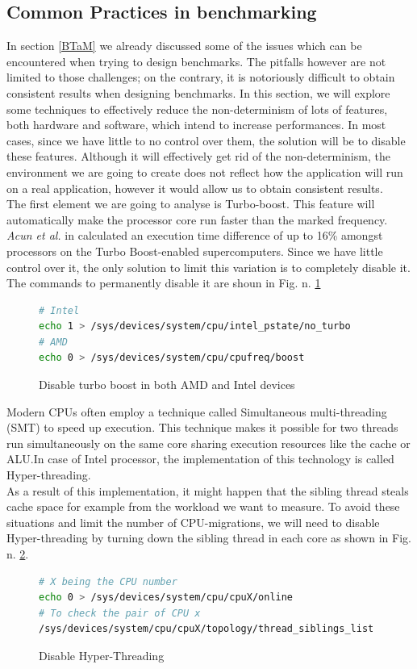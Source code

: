 \subsection{Common Practices in benchmarking}\label{sec:ben_challenges} \label{sec:remove_inter}
In section \ref{BTaM} we already discussed some of the issues which can be encountered when trying to design benchmarks. The pitfalls however are not limited to those challenges; on the contrary, it is notoriously difficult to obtain consistent results when designing benchmarks. In this section, we will explore some techniques to effectively reduce the non-determinism of lots of features, both hardware and software, which intend to increase performances. In most cases, since we have little to no control over them, the solution will be to disable these features. Although it will effectively get rid of the non-determinism, the environment we are going to create does not reflect how the application will run on a real application, however it would allow us to obtain consistent results. \\
The first element we are going to analyse is Turbo-boost. This feature will automatically make the processor core run faster than the marked frequency. \textit{Acun et al.} in \cite{turbo_boost} calculated an execution time difference of up to 16\% amongst processors on the Turbo Boost-enabled supercomputers. Since we have little control over it, the only solution to limit this variation is to completely disable it. The commands to permanently disable it are shoun in Fig. n. \ref{fig:no_boos}
\begin{figure}[h]
\begin{lstlisting}[language=bash]
# Intel
echo 1 > /sys/devices/system/cpu/intel_pstate/no_turbo
# AMD
echo 0 > /sys/devices/system/cpu/cpufreq/boost
\end{lstlisting}
\caption{Disable turbo boost in both AMD and Intel devices}
\label{fig:no_boos}
\end{figure}

Modern CPUs often employ a technique called Simultaneous multi-threading (SMT) to speed up execution. This technique makes it possible for two threads run simultaneously on the same core sharing execution resources like the cache or ALU.In case of Intel processor, the implementation of this technology is called Hyper-threading.\\
As a result of this implementation, it might happen that the sibling thread steals cache space for example from the workload we want to measure. To avoid these situations and limit the number of CPU-migrations, we will need to disable Hyper-threading by turning down the sibling thread in each core as shown in Fig. n. \ref{fig:no_ht}. 
\begin{figure}[h]
\begin{lstlisting}[language=bash]
# X being the CPU number
echo 0 > /sys/devices/system/cpu/cpuX/online
# To check the pair of CPU x
/sys/devices/system/cpu/cpuX/topology/thread_siblings_list
\end{lstlisting}
\caption{Disable Hyper-Threading}
\label{fig:no_ht}
\end{figure}

